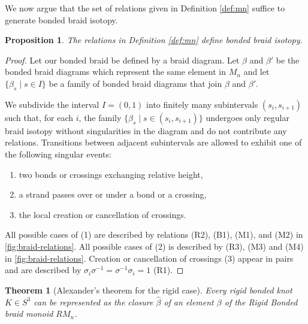 \documentclass{article}
\theoremstyle{definition}
\theoremstyle{plain}
\newtheorem{theorem}{Theorem}[section]
\newtheorem{proposition}{Proposition}[section]
\theoremstyle{remark}
\begin{document}
We now argue that the set of relations given in Definition \ref{def:mn} suffice to generate bonded braid isotopy.
\begin{proposition}\label{prop:relations}
    The relations in Definition \ref{def:mn} define bonded braid isotopy.
\end{proposition}
\begin{proof}
Let our bonded braid be defined by a braid diagram. Let $\beta$ and $\beta'$ be the bonded braid diagrams which represent the same element in $M_n$ and let $\{\beta_s \mid s \in I\}$ be a family of bonded braid diagrams that join $\beta$ and $\beta'$. 

We subdivide the interval $I = (0,1)$ into finitely many subintervals $(s_i, s_{i+1})$ such that, for each $i$, the family $\{ \beta_s \mid s \in (s_i, s_{i+1}) \}$ undergoes only regular braid isotopy without singularities in the diagram and do not contribute any relations. Transitions between adjacent subintervals are allowed to exhibit one of the following singular events:
\begin{enumerate}
    \item[(1)] two bonds or crossings exchanging relative height,
    \item[(2)] a strand passes over or under a bond or a crossing,
    \item[(3)] the local creation or cancellation of crossings.
\end{enumerate}

All possible cases of (1) are described by relations (R2), (B1), (M1), and (M2) in \autoref{fig:braid-relations}. All possible cases of (2) is described by (R3), (M3) and (M4) in \autoref{fig:braid-relations}. Creation or cancellation of crossings (3) appear in pairs and are  described by $\sigma_i \sigma^{-1} = \sigma^{-1} \sigma_i = 1$ (R1). 
\end{proof}
\begin{theorem}[Alexander's theorem for the rigid case]
Every rigid bonded knot $K \in S^3$ can be represented as the closure $\hat \beta$ of an element $\beta$ of the Rigid Bonded braid monoid $RM_n$. \label{thm:rigid_akexander}
\end{theorem}
\end{document}
